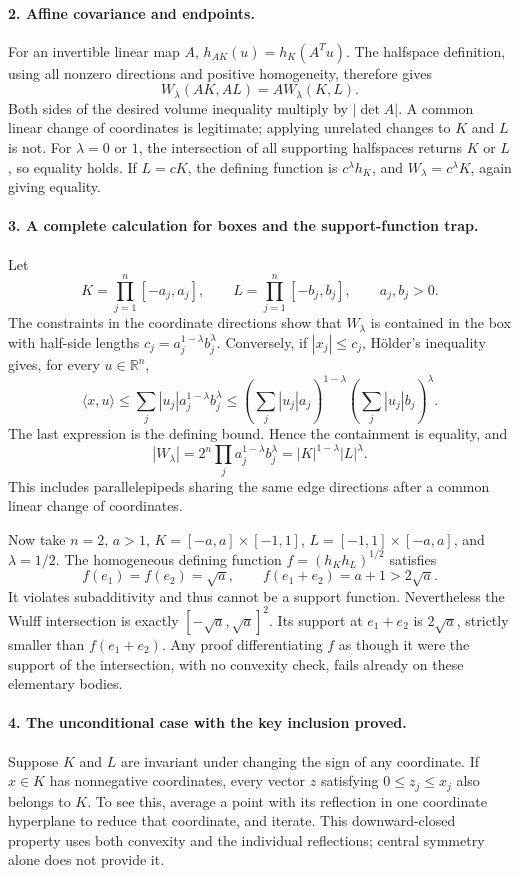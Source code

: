 \documentclass[11pt]{article}
\begin{document}
\paragraph{2. Affine covariance and endpoints.}
For an invertible linear map $A$, $h_{AK}(u)=h_K(A^Tu)$. The halfspace definition, using all nonzero directions and positive homogeneity, therefore gives
\[
 W_\lambda(AK,AL)=A W_\lambda(K,L).
\]
Both sides of the desired volume inequality multiply by $|\det A|$. A common linear change of coordinates is legitimate; applying unrelated changes to $K$ and $L$ is not. For $\lambda=0$ or $1$, the intersection of all supporting halfspaces returns $K$ or $L$, so equality holds. If $L=cK$, the defining function is $c^\lambda h_K$, and $W_\lambda=c^\lambda K$, again giving equality.

\paragraph{3. A complete calculation for boxes and the support-function trap.}
Let
\[
 K=\prod_{j=1}^n[-a_j,a_j],\qquad
 L=\prod_{j=1}^n[-b_j,b_j],\qquad a_j,b_j>0.
\]
The constraints in the coordinate directions show that $W_\lambda$ is contained in the box with half-side lengths $c_j=a_j^{1-\lambda}b_j^\lambda$. Conversely, if $|x_j|\leq c_j$, H\"older's inequality gives, for every $u\in\mathbb R^n$,
\[
 \langle x,u\rangle\leq\sum_j |u_j|a_j^{1-\lambda}b_j^\lambda
 \leq\left(\sum_j|u_j|a_j\right)^{1-\lambda}
       \left(\sum_j|u_j|b_j\right)^\lambda.
\]
The last expression is the defining bound. Hence the containment is equality, and
\[
 |W_\lambda|=2^n\prod_j a_j^{1-\lambda}b_j^\lambda
 =|K|^{1-\lambda}|L|^\lambda.
\]
This includes parallelepipeds sharing the same edge directions after a common linear change of coordinates.

Now take $n=2$, $a>1$, $K=[-a,a]\times[-1,1]$, $L=[-1,1]\times[-a,a]$, and $\lambda=1/2$. The homogeneous defining function $f=(h_Kh_L)^{1/2}$ satisfies
\[
 f(e_1)=f(e_2)=\sqrt a,\qquad f(e_1+e_2)=a+1>2\sqrt a.
\]
It violates subadditivity and thus cannot be a support function. Nevertheless the Wulff intersection is exactly $[-\sqrt a,\sqrt a]^2$. Its support at $e_1+e_2$ is $2\sqrt a$, strictly smaller than $f(e_1+e_2)$. Any proof differentiating $f$ as though it were the support of the intersection, with no convexity check, fails already on these elementary bodies.

\paragraph{4. The unconditional case with the key inclusion proved.}
Suppose $K$ and $L$ are invariant under changing the sign of any coordinate. If $x\in K$ has nonnegative coordinates, every vector $z$ satisfying $0\leq z_j\leq x_j$ also belongs to $K$. To see this, average a point with its reflection in one coordinate hyperplane to reduce that coordinate, and iterate. This downward-closed property uses both convexity and the individual reflections; central symmetry alone does not provide it.
\end{document}
